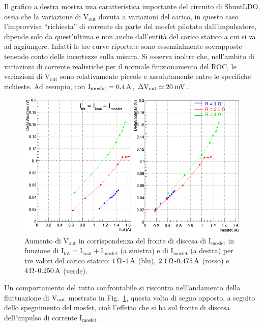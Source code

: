 Il grafico a destra mostra una caratteristica importante del circuito di ShuntLDO, ossia che la variazione di $\mathrm{V_{out}}$ dovuta a variazioni del carico, in questo caso l'improvvisa ``richiesta'' di corrente da parte del mosfet pilotato dall'impulsatore, dipende solo da quest'ultima e non anche dall'entit\`a del carico statico a cui si va ad aggiungere. Infatti le tre curve riportate sono essenzialmente sovrapposte tenendo conto delle incertezze sulla misura.
Si osserva inoltre che, nell'ambito di variazioni di corrente realistiche per il normale funzionamento del ROC, le variazioni di $\mathrm{V_{out}}$ sono relativamente piccole e assolutamente entro le specifiche richieste. Ad esempio, con $\mathrm{I_{mosfet}= 0.4\rm \, A}$, $\mathrm{\Delta V_{out} \simeq 20\rm \; mV}$.

\begin{figure}
\centering
\includegraphics[width=0.9\linewidth]{Immagini/VoutOver}
\caption{Aumento di $\mathrm{V_{out}}$ in corrispondenza del fronte di discesa di $\mathrm{I_{mosfet}}$ in funzione di $\mathrm{I_{tot} = I_{load}+I_{mosfet}}$ (a sinistra) e di $\mathrm{I_{mosfet}}$ (a destra) per tre valori del carico statico: $1{\rm \, \Omega}$-$1\rm \, A$ (blu), $2.1{\rm \, \Omega}$-$0.475\rm \, A$ (rosso) e $4{\rm \, \Omega}$-$0.250\rm \, A$ (verde).}
\label{VoutOver}
\end{figure}

Un comportamento del tutto confrontabile si riscontra nell'andamento della fluttuazione di $\mathrm{V_{out}}$ mostrato in Fig.~\ref{VoutOver}, questa volta di segno opposto, a seguito dello spegnimento del mosfet, cioè l'effetto che si ha sul fronte di discesa dell'impulso di corrente $\mathrm{I_{mosfet}}$.

